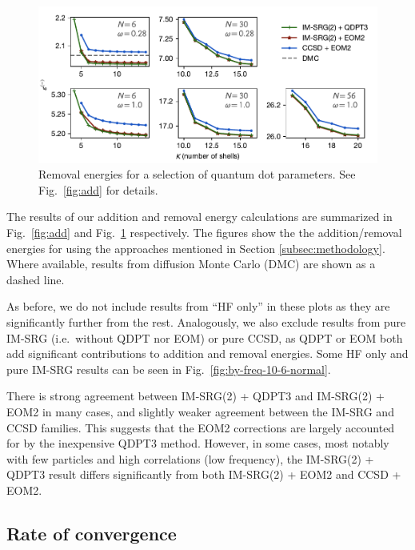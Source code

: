 \begin{figure}
  \centering
  \includegraphics{fig-rm2.pdf}
  \caption{Removal energies for a selection of quantum dot parameters.  See Fig.~\ref{fig:add} for details.}
  \label{fig:rm}
\end{figure}

The results of our addition and removal energy calculations are
summarized in Fig.~\ref{fig:add} and Fig.~\ref{fig:rm}
respectively.  The figures show the the addition/removal energies for
using the approaches mentioned in Section \ref{subsec:methodology}.
Where available, results from diffusion Monte Carlo
(DMC) \cite{PhysRevB.84.115302} are shown as a dashed line.

As before, we do not include results from ``HF only'' in these plots
as they are significantly further from the rest.  Analogously, we also
exclude results from pure IM-SRG (i.e.\ without QDPT nor EOM) or pure
CCSD, as QDPT or EOM both add significant contributions to addition
and removal energies.  Some HF only and pure IM-SRG results can be
seen in Fig.~\ref{fig:by-freq-10-6-normal}.

There is strong agreement between IM-SRG(2) + QDPT3 and IM-SRG(2) +
EOM2 in many cases, and slightly weaker agreement between the IM-SRG
and CCSD families.  This suggests that the EOM2 corrections are
largely accounted for by the inexpensive QDPT3 method.  However, in
some cases, most notably with few particles and high correlations (low
frequency), the IM-SRG(2) + QDPT3 result differs significantly from
both IM-SRG(2) + EOM2 and CCSD + EOM2.

\subsection{Rate of convergence}


